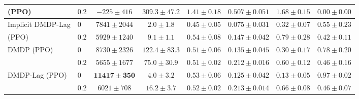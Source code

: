 \begin{tabular}{llcccccc}
(PPO) & $0.2$ & $-225\pm416$ & $309.3\pm47.2$ & $1.41\pm0.18$ & $0.507\pm0.051$ & $1.68\pm0.15$ & $0.00\pm0.00$ \\
\midrule
Implicit DMDP-Lag & $0$ & $7841\pm2044$ & $2.0\pm1.8$ & $0.45\pm0.05$ & $\bm{0.075\pm0.031}$ & $0.32\pm0.07$ & $0.55\pm0.23$ \\
(PPO) & $0.2$ & $5929\pm1240$ & $\bm{9.1\pm1.1}$ & $0.54\pm0.08$ & $0.147\pm0.042$ & $0.79\pm0.28$ & $0.42\pm0.11$ \\
\midrule
DMDP (PPO) & $0$ & $8730\pm2326$ & $122.4\pm83.3$ & $0.51\pm0.06$ & $0.135\pm0.045$ & $0.30\pm0.17$ & $0.78\pm0.20$ \\
 & $0.2$ & $5655\pm1677$ & $75.0\pm30.9$ & $0.51\pm0.02$ & $0.212\pm0.016$ & $0.60\pm0.12$ & $0.46\pm0.16$ \\
\midrule
DMDP-Lag (PPO) & $0$ & $\bm{11417\pm350}$ & $4.0\pm3.2$ & $0.53\pm0.06$ & $0.125\pm0.042$ & $\bm{0.13\pm0.05}$ & $\bm{0.97\pm0.02}$ \\
 & $0.2$ & $6021\pm708$ & $16.2\pm3.7$ & $0.52\pm0.02$ & $0.213\pm0.014$ & $0.66\pm0.08$ & $0.46\pm0.07$ \\
\bottomrule
\end{tabular}
